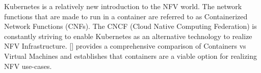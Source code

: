 Kubernetes is a relatively new introduction to the NFV world. The network functions that are made to run in a container are referred to as Containerized Network Functions (CNFs). The CNCF (Cloud Native Computing Federation) is constantly striving to enable Kubernetes as an alternative technology to realize NFV Infrastructure. [\cite{sharma16}] provides a comprehensive comparison of Containers vs Virtual Machines and establishes that containers are a viable option for realizing NFV use-cases.
